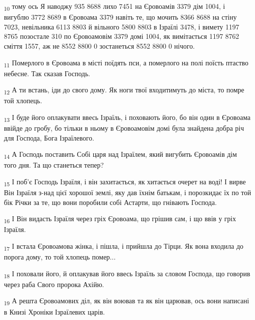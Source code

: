 \begin{tcolorbox}
\textsubscript{10} тому ось Я наводжу 935 8688 лихо 7451 на Єровоамів 3379 дім 1004, і вигублю 3772 8689 в Єровоама 3379 навіть те, що мочить 8366 8688 на стіну 7023, невільника 6113 8803 й вільного 5800 8803 в Ізраїлі 3478, і вимету 1197 8765 позостале 310 по Єровоамовім 3379 домі 1004, як вимітається 1197 8762 сміття 1557, аж не 8552 8800 0 зостанеться 8552 8800 0 нічого.
\end{tcolorbox}
\begin{tcolorbox}
\textsubscript{11} Померлого в Єровоама в місті поїдять пси, а померлого на полі поїсть птаство небесне. Так сказав Господь.
\end{tcolorbox}
\begin{tcolorbox}
\textsubscript{12} А ти встань, іди до свого дому. Як ноги твої входитимуть до міста, то помре той хлопець.
\end{tcolorbox}
\begin{tcolorbox}
\textsubscript{13} І буде його оплакувати ввесь Ізраїль, і поховають його, бо він один в Єровоама ввійде до гробу, бо тільки в ньому в Єровоамовім домі була знайдена добра річ для Господа, Бога Ізраїлевого.
\end{tcolorbox}
\begin{tcolorbox}
\textsubscript{14} А Господь поставить Собі царя над Ізраїлем, який вигубить Єровоамів дім того дня. Та що станеться тепер?
\end{tcolorbox}
\begin{tcolorbox}
\textsubscript{15} І поб'є Господь Ізраїля, і він захитається, як хитається очерет на воді! І вирве Він Ізраїля з-над цієї хорошої землі, яку дав їхнім батькам, і порозкидає їх по той бік Річки за те, що вони поробили собі Астарти, що гнівають Господа.
\end{tcolorbox}
\begin{tcolorbox}
\textsubscript{16} І Він видасть Ізраїля через гріх Єровоама, що грішив сам, і що ввів у гріх Ізраїля.
\end{tcolorbox}
\begin{tcolorbox}
\textsubscript{17} І встала Єровоамова жінка, і пішла, і прийшла до Тірци. Як вона входила до порога дому, то той хлопець помер...
\end{tcolorbox}
\begin{tcolorbox}
\textsubscript{18} І поховали його, й оплакував його ввесь Ізраїль за словом Господа, що говорив через раба Свого пророка Ахійю.
\end{tcolorbox}
\begin{tcolorbox}
\textsubscript{19} А решта Єровоамових діл, як він воював та як він царював, ось вони написані в Книзі Хроніки Ізраїлевих царів.
\end{tcolorbox}
